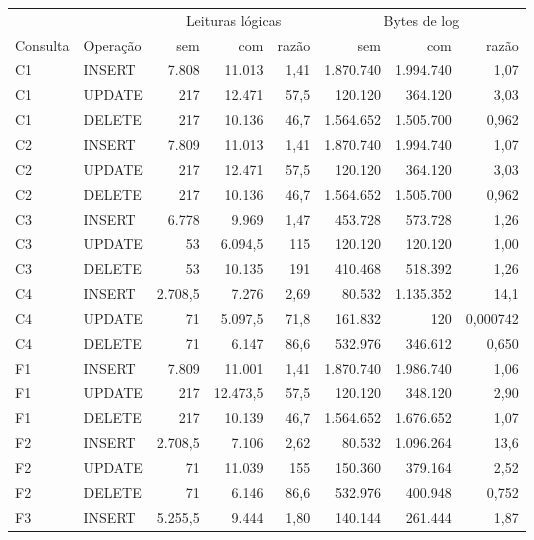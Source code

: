 {\small\setlength{\tabcolsep}{4pt}
\begin{tabular}{llrrrrrr}
\toprule
 &  & \multicolumn{3}{c}{Leituras lógicas} & \multicolumn{3}{c}{Bytes de log} \\
\cmidrule(lr){3-5}\cmidrule(lr){6-8}
Consulta & Operação & sem & com & razão & sem & com & razão \\
\midrule
C1 & INSERT & 7.808 & 11.013 & 1,41 & 1.870.740 & 1.994.740 & 1,07 \\
C1 & UPDATE & 217 & 12.471 & 57,5 & 120.120 & 364.120 & 3,03 \\
C1 & DELETE & 217 & 10.136 & 46,7 & 1.564.652 & 1.505.700 & 0,962 \\
C2 & INSERT & 7.809 & 11.013 & 1,41 & 1.870.740 & 1.994.740 & 1,07 \\
C2 & UPDATE & 217 & 12.471 & 57,5 & 120.120 & 364.120 & 3,03 \\
C2 & DELETE & 217 & 10.136 & 46,7 & 1.564.652 & 1.505.700 & 0,962 \\
C3 & INSERT & 6.778 & 9.969 & 1,47 & 453.728 & 573.728 & 1,26 \\
C3 & UPDATE & 53 & 6.094,5 & 115 & 120.120 & 120.120 & 1,00 \\
C3 & DELETE & 53 & 10.135 & 191 & 410.468 & 518.392 & 1,26 \\
C4 & INSERT & 2.708,5 & 7.276 & 2,69 & 80.532 & 1.135.352 & 14,1 \\
C4 & UPDATE & 71 & 5.097,5 & 71,8 & 161.832 & 120 & 0,000742 \\
C4 & DELETE & 71 & 6.147 & 86,6 & 532.976 & 346.612 & 0,650 \\
F1 & INSERT & 7.809 & 11.001 & 1,41 & 1.870.740 & 1.986.740 & 1,06 \\
F1 & UPDATE & 217 & 12.473,5 & 57,5 & 120.120 & 348.120 & 2,90 \\
F1 & DELETE & 217 & 10.139 & 46,7 & 1.564.652 & 1.676.652 & 1,07 \\
F2 & INSERT & 2.708,5 & 7.106 & 2,62 & 80.532 & 1.096.264 & 13,6 \\
F2 & UPDATE & 71 & 11.039 & 155 & 150.360 & 379.164 & 2,52 \\
F2 & DELETE & 71 & 6.146 & 86,6 & 532.976 & 400.948 & 0,752 \\
F3 & INSERT & 5.255,5 & 9.444 & 1,80 & 140.144 & 261.444 & 1,87 \\

\end{tabular}}
